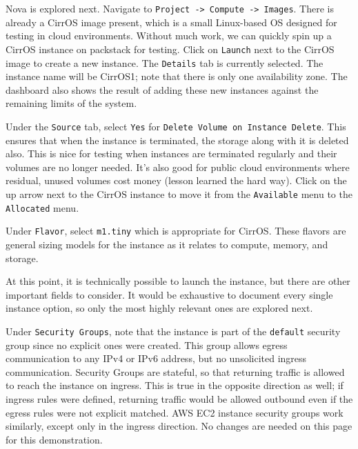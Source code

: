
Nova is explored next. Navigate to \verb|Project -> Compute -> Images|. There is
already a CirrOS image present, which is a small Linux-based OS designed for
testing in cloud environments. Without much work, we can quickly spin up a
CirrOS instance on packstack for testing. Click on \verb|Launch| next to the
CirrOS image to create a new instance. The \verb|Details| tab is currently
selected. The instance name will be CirrOS1; note that there is only one
availability zone.  The dashboard also shows the result of adding these new
instances against the remaining limits of the system.


Under the \verb|Source| tab, select \verb|Yes| for
\verb|Delete Volume on Instance Delete|. This ensures that when the instance
is terminated, the storage along with it is deleted also. This is nice for
testing when instances are terminated regularly and their volumes are no
longer needed. It’s also good for public cloud environments where residual,
unused volumes cost money (lesson learned the hard way). Click on the up arrow
next to the CirrOS instance to move it from the \verb|Available| menu to the
\verb|Allocated| menu.


Under \verb|Flavor|, select \verb|m1.tiny| which is appropriate for CirrOS\@.
These flavors are general sizing models for the instance as it relates to
compute, memory, and storage.


At this point, it is technically possible to launch the instance, but there
are other important fields to consider. It would be exhaustive to document
every single instance option, so only the most highly relevant ones are
explored next.

Under \verb|Security Groups|, note that the instance is part of the
\verb|default| security group since no explicit ones were created. This group
allows egress communication to any IPv4 or IPv6 address, but no unsolicited
ingress communication. Security Groups are stateful, so that returning traffic
is allowed to reach the instance on ingress. This is true in the opposite
direction as well; if ingress rules were defined, returning traffic would be
allowed outbound even if the egress rules were not explicit matched. AWS EC2
instance security groups work similarly, except only in the ingress direction.
No changes are needed on this page for this demonstration.

